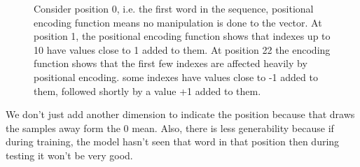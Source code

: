 \documentclass[11pt]{article}
\begin{document}
\begin{figure}[H]
    \centering
    \caption*{Consider position 0, i.e. the first word in the sequence, positional encoding function means no manipulation is done to the vector. At position 1, the positional encoding function shows that indexes up to 10 have values close to 1 added to them. At position 22 the encoding function shows that the first few indexes are affected heavily by positional encoding. some indexes have values close to -1 added to them, followed shortly by a value +1 added to them.}
\end{figure}

We don't just add another dimension to indicate the position because that draws the samples away form the 0 mean. Also, there is less generability because if during training, the model hasn't seen that word in that position then during testing it won't be very good.
\end{document}
